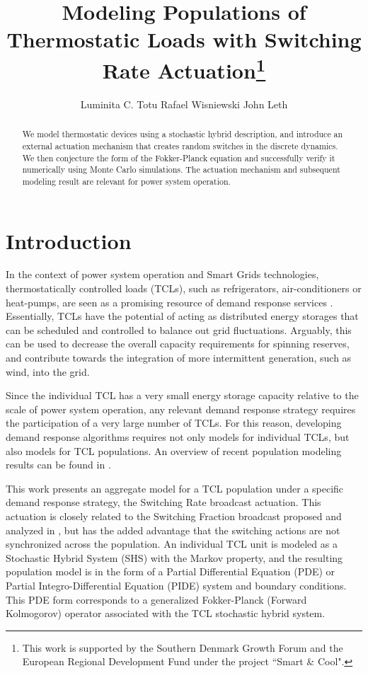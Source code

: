 \documentclass[submission,copyright,creativecommons]{eptcs}
\title{Modeling Populations of Thermostatic Loads with Switching Rate Actuation\thanks{This work is supported by the Southern Denmark Growth Forum and the
European Regional Development Fund under the project ``Smart \& Cool".}}
\author{Luminita C. Totu \qquad Rafael Wisniewski \qquad John Leth
\institute{Automation and Control, Aalborg University, Denmark}
\email{lct,raf,jjl@es.aau.dk}
}
\begin{document}
\maketitle

\begin{abstract}
We model thermostatic devices using a stochastic hybrid description, and introduce an external actuation mechanism that creates random switches in the discrete dynamics. 
We then conjecture the form of the Fokker-Planck equation and successfully verify it numerically using Monte Carlo simulations. 
The actuation mechanism and subsequent modeling result are relevant for power system operation.
\end{abstract}

\section{Introduction}

In the context of power system operation and Smart Grids technologies, thermostatically controlled loads (TCLs), such as refrigerators, air-conditioners or heat-pumps, are seen as a promising resource of demand response services \cite{IREP2013,CAL2}. Essentially, TCLs have the potential of acting as distributed energy storages that can be scheduled and controlled to balance out grid fluctuations. Arguably,  this can be used to decrease the overall capacity requirements for spinning reserves, and contribute towards the integration of more intermittent generation, such as wind, into the grid. 

Since the individual TCL has a very small energy storage capacity relative to the scale of power system operation, any relevant demand response strategy requires the participation of a very large number of TCLs. For this reason, developing demand response algorithms requires not only models for individual TCLs, but also models for TCL populations. An overview of recent population modeling results can be found in \cite{MO2013}. 

This work presents an aggregate model for a TCL population under a specific demand response strategy, the Switching Rate broadcast actuation. This actuation is closely related to the Switching Fraction broadcast proposed and analyzed in \cite{zhang2013aggregated,totu2013control,totu2014demand}, but has the added advantage that the switching actions are not synchronized across the population. An individual TCL unit is modeled as a Stochastic Hybrid System (SHS) with the Markov property, and the resulting population model is in the form of a Partial Differential Equation (PDE) or Partial Integro-Differential Equation (PIDE) system and boundary conditions. This PDE form corresponds to a generalized Fokker-Planck (Forward Kolmogorov) operator \cite{bect2010unifying} associated with the TCL stochastic hybrid system. 
\end{document}
